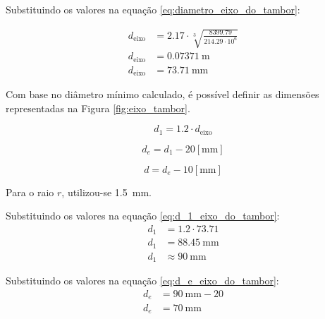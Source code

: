 Substituindo os valores na equação \eqref{eq:diametro_eixo_do_tambor}:

\begin{align*}
  d_{\text{eixo}} & = \num{2.17} \cdot \sqrt[3]{\frac{\num{8399.79}}{\num{214.29} \cdot 10^6}} \\
  d_{\text{eixo}} & = \SI{0.07371}{\meter}                                                     \\
  d_{\text{eixo}} & = \boxed{\SI{73.71}{\milli\meter}}
\end{align*}

Com base no diâmetro mínimo calculado, é possível definir as dimensões representadas na Figura \ref{fig:eixo_tambor}.

\begin{equation}
  d_1 = \num{1.2} \cdot d_{\text{eixo}}
  \label{eq:d_1_eixo_do_tambor}
\end{equation}

\begin{equation}
  d_e = d_1 - 20 \left[ \si{\milli\meter} \right]
  \label{eq:d_e_eixo_do_tambor}
\end{equation}

\begin{equation}
  d = d_e - 10 \left[ \si{\milli\meter} \right]
  \label{eq:d_eixo_do_tambor}
\end{equation}

Para o raio $r$, utilizou-se \SI{1.5}{\milli\meter}.

Substituindo os valores na equação \eqref{eq:d_1_eixo_do_tambor}:
\begin{align*}
  d_1 & = \num{1.2} \cdot \num{73.71}         \\
  d_1 & = \SI{88.45}{\milli\meter}            \\
  d_1 & \approx \boxed{\SI{90}{\milli\meter}}
\end{align*}

Substituindo os valores na equação \eqref{eq:d_e_eixo_do_tambor}:
\begin{align*}
  d_e & = \SI{90}{\milli\meter} - 20    \\
  d_e & = \boxed{\SI{70}{\milli\meter}}
\end{align*}
